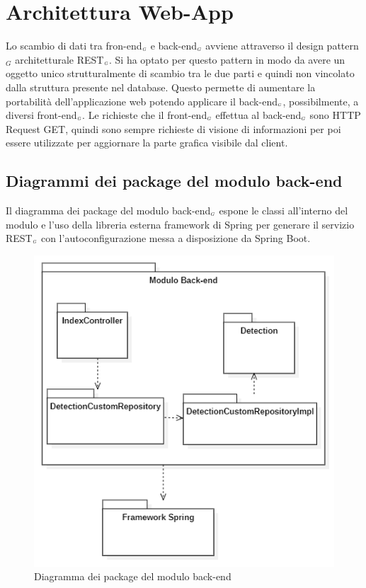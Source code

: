 \section{Architettura Web-App}\label{ArchitetturaDelProdottoWebApp}
Lo scambio di dati tra fron-end$_{\scaleto{G}{3pt}}$ e back-end$_{\scaleto{G}{3pt}}$ avviene attraverso il design pattern$_G$ architetturale REST$_{\scaleto{G}{3pt}}$. Si ha optato per questo pattern in modo da avere un oggetto unico strutturalmente di scambio tra le due parti e quindi non vincolato  dalla  struttura  presente  nel  database.
Questo permette di aumentare la portabilità dell'applicazione web potendo applicare il back-end$_{\scaleto{G}{3pt}}$, possibilmente, a diversi front-end$_{\scaleto{G}{3pt}}$. Le richieste che il front-end$_{\scaleto{G}{3pt}}$ effettua al back-end$_{\scaleto{G}{3pt}}$ sono HTTP Request GET, quindi sono sempre richieste di visione di informazioni per poi essere utilizzate per aggiornare la parte grafica visibile dal client.
\subsection{Diagrammi dei package del modulo back-end}\label{DiagrammaDeiPackageRestApi}
Il diagramma dei package del modulo back-end$_{\scaleto{G}{3pt}}$ espone le classi all'interno del modulo e l'uso della libreria esterna framework di Spring per generare il servizio REST$_{\scaleto{G}{3pt}}$ con l'autoconfigurazione messa a disposizione da Spring Boot.
\begin{center}
	\begin{figure}[H]
		\centering\includegraphics[scale=0.8]{../immagini/diag_PB/diag_pack_spring.png}
		\caption{Diagramma dei package del modulo back-end}
	\end{figure}
\end{center}
